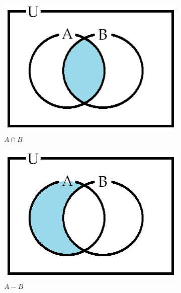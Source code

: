\documentclass{oblivoir}
\begin{document}
\begin{enumerate}[label=\arabic*.,itemsep=15pt]
\begin{figure}[h]
\begin{subfigure}{0.2\textwidth}
                \includegraphics[width=\linewidth]{summary_4-2}
                \caption*{\(A\cap B\)}
        \end{subfigure}%
\quad
        \begin{subfigure}{0.2\textwidth}
                \includegraphics[width=\linewidth]{summary_4-3}
                \caption*{\(A-B\)}
        \end{subfigure}%
\quad
        \begin{subfigure}{0.2\textwidth}

\end{subfigure}
\end{figure}
\end{enumerate}
\end{document}
